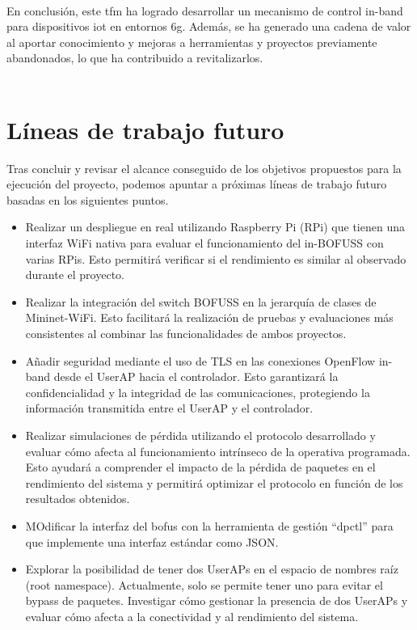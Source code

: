 \\
En conclusión, este \gls{tfm} ha logrado desarrollar un mecanismo de control in-band para dispositivos \gls{iot} en entornos \gls{6g}. Además, se ha generado una cadena de valor al aportar conocimiento y mejoras a herramientas y proyectos previamente abandonados, lo que ha contribuido a revitalizarlos.\\
\\



\section{Líneas de trabajo futuro}
\label{trabajoFuturo}

Tras concluir y revisar el alcance conseguido de los objetivos propuestos para la ejecución del proyecto, podemos apuntar a próximas líneas de trabajo futuro basadas en los siguientes puntos.
\begin{itemize}
    \item Realizar un despliegue en real utilizando Raspberry Pi (RPi) que tienen una interfaz WiFi nativa para evaluar el funcionamiento del in-BOFUSS con varias RPis. Esto permitirá verificar si el rendimiento es similar al observado durante el proyecto.

    \item Realizar la integración del switch BOFUSS en la jerarquía de clases de Mininet-WiFi. Esto facilitará la realización de pruebas y evaluaciones más consistentes al combinar las funcionalidades de ambos proyectos.

    \item Añadir seguridad mediante el uso de TLS en las conexiones OpenFlow in-band desde el UserAP hacia el controlador. Esto garantizará la confidencialidad y la integridad de las comunicaciones, protegiendo la información transmitida entre el UserAP y el controlador.

    \item Realizar simulaciones de pérdida utilizando el protocolo desarrollado y evaluar cómo afecta al funcionamiento intrínseco de la operativa programada. Esto ayudará a comprender el impacto de la pérdida de paquetes en el rendimiento del sistema y permitirá optimizar el protocolo en función de los resultados obtenidos.

    \item MOdificar la interfaz del \gls{bofus} con la herramienta de gestión ``dpctl'' para que implemente una interfaz estándar como JSON.

    \item Explorar la posibilidad de tener dos UserAPs en el espacio de nombres raíz (root namespace). Actualmente, solo se permite tener uno para evitar el bypass de paquetes. Investigar cómo gestionar la presencia de dos UserAPs y evaluar cómo afecta a la conectividad y al rendimiento del sistema.
\end{itemize}

